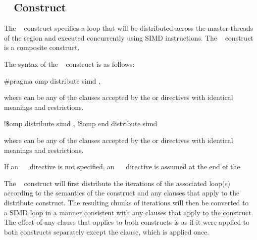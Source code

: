 \subsection{~ Construct}
\label{subsec:distribute simd Construct}
\summary
The ~ construct specifies a loop that will be distributed across the 
master threads of the  region and executed concurrently using SIMD instructions. The ~ construct is a composite construct.

\syntax
The syntax of the ~ construct is as follows:

\ccppspecificstart
\begin{boxedcode}
\#pragma omp distribute simd \plc{[clause[ [},\plc{] clause] ... ]}
\end{boxedcode}

where  can be any of the clauses accepted by the  or  
directives with identical meanings and restrictions.
\ccppspecificend

\fortranspecificstart
\begin{boxedcode}
!\$omp distribute simd \plc{[clause[ [},\plc{] clause] ... ]}
\plc{[}!\$omp end distribute simd\plc{]}
\end{boxedcode}

where  can be any of the clauses accepted by the  or  
directives with identical meanings and restrictions.

If an ~~ directive is not specified, an ~~
directive is assumed at the end of the \fortranspecificend

\descr
The ~ construct will first distribute the iterations of the associated 
loop(s) according to the semantics of the  construct and any clauses that 
apply to the distribute construct. The resulting chunks of iterations will then be 
converted to a SIMD loop in a manner consistent with any clauses that apply to the 
 construct. The effect of any clause that applies to both constructs is as if it were applied to both constructs separately except the  clause, which is applied once.

